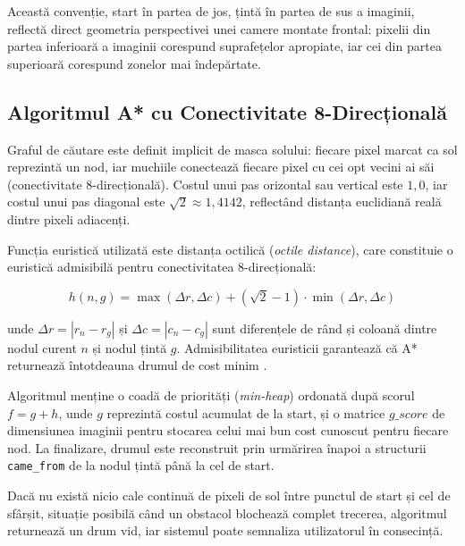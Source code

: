 \par Această convenție, start în partea de jos, țintă în partea de sus a imaginii, reflectă direct geometria perspectivei unei camere montate frontal: pixelii din partea inferioară a imaginii corespund suprafețelor apropiate, iar cei din partea superioară corespund zonelor mai îndepărtate.

\subsection{Algoritmul A* cu Conectivitate 8-Direcțională}

\par Graful de căutare este definit implicit de masca solului: fiecare pixel marcat ca sol reprezintă un nod, iar muchiile conectează fiecare pixel cu cei opt vecini ai săi (conectivitate 8-direcțională). Costul unui pas orizontal sau vertical este $1{,}0$, iar costul unui pas diagonal este $\sqrt{2} \approx 1{,}4142$, reflectând distanța euclidiană reală dintre pixeli adiacenți.

\par Funcția euristică utilizată este distanța octilică (\textit{octile distance}), care constituie o euristică admisibilă pentru conectivitatea 8-direcțională:

\begin{equation}
    h(n, g) = \max(\Delta r, \Delta c) + (\sqrt{2} - 1) \cdot \min(\Delta r, \Delta c)
\end{equation}

\noindent unde $\Delta r = |r_n - r_g|$ și $\Delta c = |c_n - c_g|$ sunt diferențele de rând și coloană dintre nodul curent $n$ și nodul țintă $g$. Admisibilitatea euristicii garantează că A* returnează întotdeauna drumul de cost minim \cite{4082128}.

\par Algoritmul menține o coadă de priorități (\textit{min-heap}) ordonată după scorul $f = g + h$, unde $g$ reprezintă costul acumulat de la start, și o matrice $g\_score$ de dimensiunea imaginii pentru stocarea celui mai bun cost cunoscut pentru fiecare nod. La finalizare, drumul este reconstruit prin urmărirea înapoi a structurii \texttt{came\_from} de la nodul țintă până la cel de start.

\par Dacă nu există nicio cale continuă de pixeli de sol între punctul de start și cel de sfârșit, situație posibilă când un obstacol blochează complet trecerea, algoritmul returnează un drum vid, iar sistemul poate semnaliza utilizatorul în consecință.
